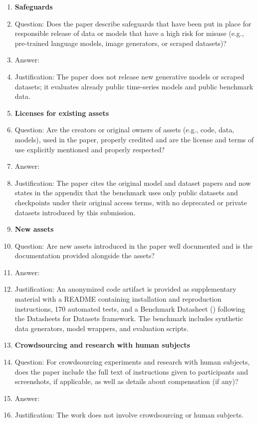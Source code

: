 \begin{enumerate}
\item {\bf Safeguards}
    \item[] Question: Does the paper describe safeguards that have been put in place for responsible release of data or models that have a high risk for misuse (e.g., pre-trained language models, image generators, or scraped datasets)?
    \item[] Answer: \answerNA{}
    \item[] Justification: The paper does not release new generative models or scraped datasets; it evaluates already public time-series models and public benchmark data.

\item {\bf Licenses for existing assets}
    \item[] Question: Are the creators or original owners of assets (e.g., code, data, models), used in the paper, properly credited and are the license and terms of use explicitly mentioned and properly respected?
    \item[] Answer: \answerYes{}
    \item[] Justification: The paper cites the original model and dataset papers and now states in
    the appendix that the benchmark uses only public datasets and checkpoints under their original
    access terms, with no deprecated or private datasets introduced by this submission.

\item {\bf New assets}
    \item[] Question: Are new assets introduced in the paper well documented and is the documentation provided alongside the assets?
    \item[] Answer: \answerYes{}
    \item[] Justification: An anonymized code artifact is provided as supplementary material with a README containing installation and reproduction instructions, 170 automated tests, and a Benchmark Datasheet () following the Datasheets for Datasets framework. The benchmark includes synthetic data generators, model wrappers, and evaluation scripts.

\item {\bf Crowdsourcing and research with human subjects}
    \item[] Question: For crowdsourcing experiments and research with human subjects, does the paper include the full text of instructions given to participants and screenshots, if applicable, as well as details about compensation (if any)?
    \item[] Answer: \answerNA{}
    \item[] Justification: The work does not involve crowdsourcing or human subjects.


\end{enumerate}
